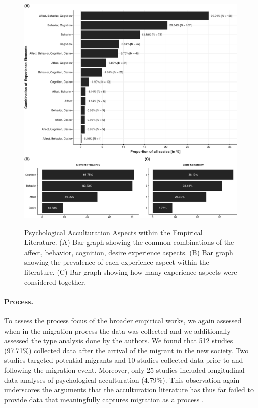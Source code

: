 \documentclass[man, 12pt, a4paper, mask]{apa7}
\begin{document}
\begin{figure}[h]
\centering
\caption{Psychological Acculturation Aspects within the Empirical Literature. (A) Bar graph showing the common combinations of the affect, behavior, cognition, desire experience aspects. (B) Bar graph showing the prevalence of each experience aspect within the literature. (C) Bar graph showing how many experience aspects were considered together.}
\includegraphics[width=\textwidth]{Figures/EmpPlotFreq-1}
\label{fig:EmpPlotFreq-1}
\end{figure}

\paragraph{Process.}

To assess the process focus of the broader empirical works, we again
assessed when in the migration process the data was collected and we
additionally assessed the type analysis done by the authors. We found
that 512 studies (97.71\%) collected data after the arrival of the
migrant in the new society. Two studies targeted potential migrants and
10 studies collected data prior to and following the migration event.
Moreover, only 25 studies included longitudinal data analyses of
psychological acculturation (4.79\%). This observation again underscores
the arguments that the acculturation literature has thus far failed to
provide data that meaningfully captures migration as a process
\citep[e.g.,][]{Brown2011, Ward2019}.
\end{document}
